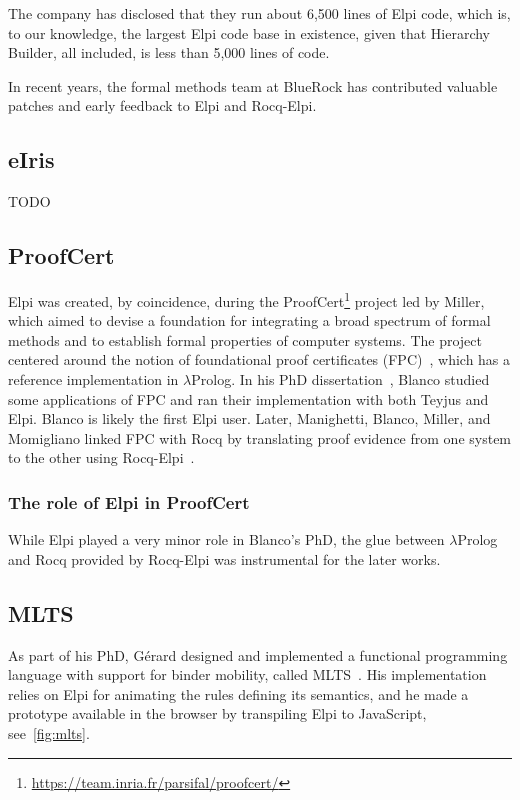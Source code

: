 \documentclass[a4paper, 11pt]{book}
\begin{document}
The company has disclosed that they run about 6,500 lines of Elpi code, which
is, to our knowledge, the largest Elpi code base in existence, given that
Hierarchy Builder, all included, is less than 5,000 lines of code.

In recent years, the formal methods team at BlueRock has contributed valuable
patches and early feedback to Elpi and Rocq-Elpi.

\subsection{eIris}

TODO


\subsection{ProofCert}

Elpi was created, by coincidence, during the
ProofCert\footnote{\url{https://team.inria.fr/parsifal/proofcert/}}
project led by Miller, which aimed to devise a foundation for integrating a
broad spectrum of formal methods and to establish formal properties of computer
systems. The project centered around the notion of foundational proof
certificates (FPC)~\cite{Marek_2016}, which has a reference implementation in
$\lambda$Prolog. In his PhD dissertation~\cite{rob}, Blanco studied some
applications of FPC and ran their implementation with both Teyjus and Elpi.
Blanco is likely the first Elpi user. Later, Manighetti, Blanco, Miller, and
Momigliano linked FPC with Rocq by translating proof evidence from one system
to the other using Rocq-Elpi~\cite{matteo,alberto}.

\subsubsection{The role of Elpi in ProofCert}

While Elpi played a very minor role in Blanco's PhD, the glue between
$\lambda$Prolog and Rocq provided by Rocq-Elpi was instrumental for the later
works.

\subsection{MLTS}

As part of his PhD, G\'{e}rard designed and implemented a
functional programming language with support for binder mobility, called MLTS~\cite{mlts}.
His implementation relies on Elpi for animating the rules defining its
semantics, and he made a prototype available in the browser by transpiling
Elpi to JavaScript, see~\cref{fig:mlts}.
\end{document}
